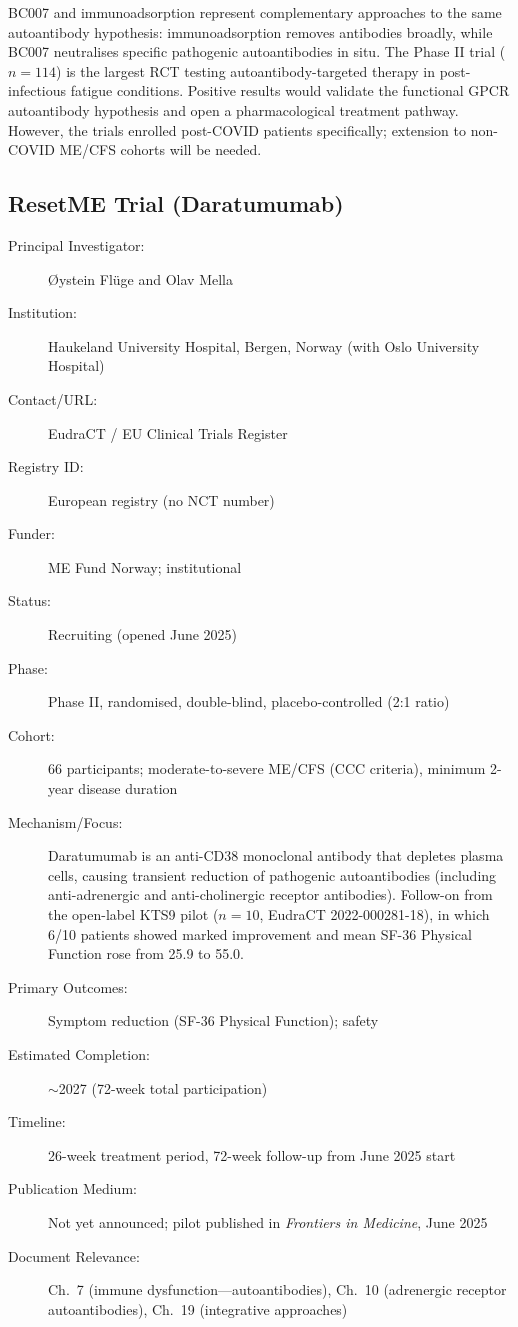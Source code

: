BC007 and immunoadsorption represent complementary approaches to the same
autoantibody hypothesis: immunoadsorption removes antibodies broadly, while
BC007 neutralises specific pathogenic autoantibodies in situ.  The Phase II
trial ($n=114$) is the largest RCT testing autoantibody-targeted therapy in
post-infectious fatigue conditions.  Positive results would validate the
functional GPCR autoantibody hypothesis and open a pharmacological treatment
pathway.  However, the trials enrolled post-COVID patients specifically;
extension to non-COVID ME/CFS cohorts will be needed.

\subsection{ResetME Trial (Daratumumab)}
\label{sec:registry-resetme}

\begin{description}
    \item[Principal Investigator:] \O{}ystein Fl\"{u}ge and Olav Mella
    \item[Institution:] Haukeland University Hospital, Bergen, Norway (with
        Oslo University Hospital)
    \item[Contact/URL:] EudraCT / EU Clinical Trials Register
    \item[Registry ID:] European registry (no NCT number)
    \item[Funder:] ME Fund Norway; institutional
    \item[Status:] Recruiting (opened June 2025)
    \item[Phase:] Phase II, randomised, double-blind, placebo-controlled
        (2:1 ratio)
    \item[Cohort:] 66 participants; moderate-to-severe ME/CFS (CCC criteria),
        minimum 2-year disease duration
    \item[Mechanism/Focus:] Daratumumab is an anti-CD38 monoclonal antibody
        that depletes plasma cells, causing transient reduction of pathogenic
        autoantibodies (including anti-adrenergic and anti-cholinergic receptor
        antibodies).  Follow-on from the open-label KTS9 pilot ($n=10$,
        EudraCT 2022-000281-18), in which 6/10 patients showed marked
        improvement and mean SF-36 Physical Function rose from 25.9 to 55.0.
    \item[Primary Outcomes:] Symptom reduction (SF-36 Physical Function);
        safety
    \item[Estimated Completion:] $\sim$2027 (72-week total participation)
    \item[Timeline:] 26-week treatment period, 72-week follow-up from June
        2025 start
    \item[Publication Medium:] Not yet announced; pilot published in
        \textit{Frontiers in Medicine}, June 2025
    \item[Document Relevance:] Ch.~7 (immune dysfunction---autoantibodies),
        Ch.~10 (adrenergic receptor autoantibodies),
        Ch.~19 (integrative approaches)
\end{description}

